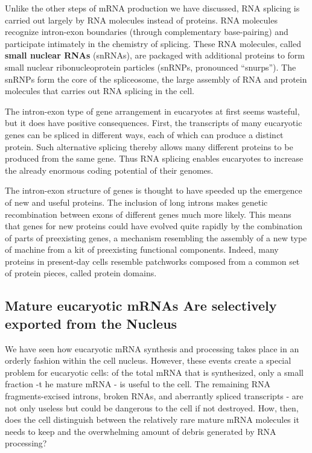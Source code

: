 Unlike the other steps of mRNA production we have discussed, RNA
splicing is carried out largely by RNA molecules instead of proteins. RNA
molecules recognize intron-exon boundaries (through complementary
base-pairing) and participate intimately in the chemistry of splicing.
These RNA molecules, called \textbf{small nuclear RNAs} (snRNAs), are packaged
with additional proteins to form small nuclear ribonucleoprotein
particles (snRNPs, pronounced “snurps”). The snRNPs form the core of
the spliceosome, the large assembly of RNA and protein molecules that
carries out RNA splicing in the cell.

The intron-exon type of gene arrangement in eucaryotes at first seems
wasteful, but it does have positive consequences. First, the transcripts of
many eucaryotic genes can be spliced in different ways, each of which
can produce a distinct protein. Such alternative splicing thereby allows
many different proteins to be produced from the same gene.
Thus RNA splicing enables eucaryotes to increase the already enormous
coding potential of their genomes.

The intron-exon structure of genes is thought to have speeded up the emergence of new and
useful proteins. The inclusion of long introns makes genetic recombination
between exons of different genes much more likely. This means that
genes for new proteins could have evolved quite rapidly by the combination
of parts of preexisting genes, a mechanism resembling the assembly
of a new type of machine from a kit of preexisting functional components.
Indeed, many proteins in present-day cells resemble patchworks
composed from a common set of protein pieces, called protein domains.

\subsection{Mature eucaryotic mRNAs Are selectively exported from the Nucleus}

We have seen how eucaryotic mRNA synthesis and processing takes
place in an orderly fashion within the cell nucleus. However, these events
create a special problem for eucaryotic cells: of the total mRNA that is
synthesized, only a small fraction -t he mature mRNA - is useful to the
cell. The remaining RNA fragments-excised introns, broken RNAs, and
aberrantly spliced transcripts - are not only useless but could be dangerous
to the cell if not destroyed. How, then, does the cell distinguish
between the relatively rare mature mRNA molecules it needs to keep and
the overwhelming amount of debris generated by RNA processing?

